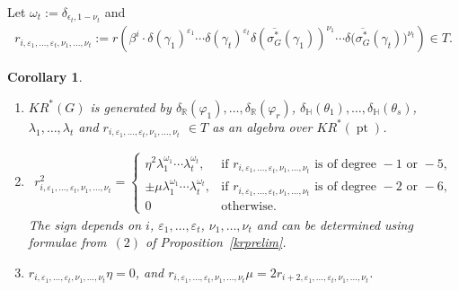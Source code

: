 \documentclass[11pt]{article}
\numberwithin{equation}{section}
\newtheorem{Corollary}[Theorem]{Corollary}
\DeclareMathOperator{\pt}{pt}
\begin{document}
\begin{Definition}
Let $\omega_t:=\delta_{\epsilon_t, 1-\nu_t}$ and
\begin{gather*}
r_{i, \varepsilon_1, \dots, \varepsilon_t, \nu_1, \dots,
\nu_t}:=r\left(\beta^i\cdot\delta(\gamma_1)^{\varepsilon_1}\cdots\delta(\gamma_t)^{\varepsilon_t}\delta(\overline{\sigma_G^*}
(\gamma_1))^{\nu_1}\cdots\delta\big(\overline{\sigma_G^*}(\gamma_t)\big)^{\nu_t}\right)\in T.
\end{gather*}
\end{Definition}
\begin{Corollary}\label{krglooseend}\quad
\begin{enumerate}\itemsep=0pt
\item[$1.$]
$KR^*(G)$ is generated by $\delta_\mathbb{R}(\varphi_1),  {\dots}, \delta_\mathbb{R}(\varphi_r)$,
$\delta_\mathbb{H}(\theta_1),  {\dots}, \delta_\mathbb{H}(\theta_s)$, $\lambda_1,  {\dots}, \lambda_t\!$ and $r_{i,
\varepsilon_1, {\dots}, \varepsilon_t, \nu_1, {\dots}, \nu_t}$ $\in T$ as an algebra over $KR^*(\pt)$.
\item[$2.$]
\begin{gather*}
r_{i, \varepsilon_1, \dots, \varepsilon_t, \nu_1, \dots, \nu_t}^2=
\begin{cases}
\eta^2\lambda_1^{\omega_1}\cdots\lambda_t^{\omega_t},
&\text{if }r_{i, \varepsilon_1, \dots, \varepsilon_t, \nu_1, \dots, \nu_t}\text{ is of degree }-1\text{ or }-5,
\\
\pm\mu\lambda_1^{\omega_1}\cdots\lambda_t^{\omega_t},
&\text{if }r_{i, \varepsilon_1, \dots, \varepsilon_t, \nu_1, \dots, \nu_t}\text{ is of degree }-2\text{ or }-6,
\\
0
&\text{otherwise}.
\end{cases}
\end{gather*}
The sign depends on $i$, $\varepsilon_1, \dots, \varepsilon_t$, $\nu_1, \dots, \nu_t$ and can be determined using formulae
from~$(2)$ of Proposition~{\rm \ref{krprelim}}.
\item[$3.$]
$r_{i, \varepsilon_1, \dots, \varepsilon_t, \nu_1, \dots, \nu_t}\eta=0$, and $r_{i, \varepsilon_1, \dots, \varepsilon_t,
\nu_1, \dots, \nu_t}\mu=2r_{i+2, \varepsilon_1, \dots, \varepsilon_t, \nu_1, \dots, \nu_t}$.
\end{enumerate}
\end{Corollary}
\end{document}
